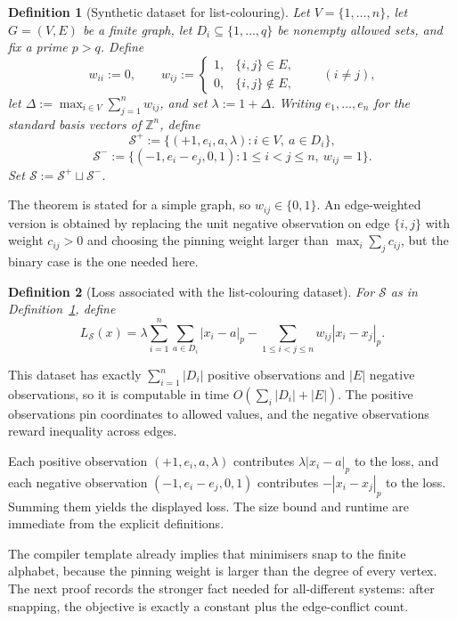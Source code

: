 \documentclass[11pt]{article}
\newtheorem{definition}{Definition}
\begin{document}
\begin{definition}[Synthetic dataset for list-colouring]
\label{def:list-dataset}
Let \(V=\{1,\dots,n\}\), let \(G=(V,E)\) be a finite graph, let \(D_i\subseteq \{1,\dots,q\}\) be nonempty allowed sets, and fix a prime \(p>q\). Define
\[
w_{ii}:=0,
\qquad
w_{ij}:=
\begin{cases}
1, & \{i,j\}\in E,\\
0, & \{i,j\}\notin E,
\end{cases}
\qquad (i\neq j),
\]
let \(\Delta:=\max_{i\in V}\sum_{j=1}^n w_{ij}\), and set \(\lambda:=1+\Delta\). Writing \(e_1,\dots,e_n\) for the standard basis vectors of \(\mathbb Z^n\), define
\[
\mathcal S^+ := \{(+1,e_i,a,\lambda): i\in V,\ a\in D_i\},
\]
\[
\mathcal S^- := \{(-1,e_i-e_j,0,1): 1\le i<j\le n,\ w_{ij}=1\}.
\]
Set \(\mathcal S:=\mathcal S^+\sqcup\mathcal S^-\).
\end{definition}

The theorem is stated for a simple graph, so \(w_{ij}\in\{0,1\}\). An edge-weighted version is obtained by replacing the unit negative observation on edge \(\{i,j\}\) with weight \(c_{ij}>0\) and choosing the pinning weight larger than \(\max_i\sum_j c_{ij}\), but the binary case is the one needed here.

\begin{definition}[Loss associated with the list-colouring dataset]
\label{def:list-loss}
For \(\mathcal S\) as in Definition~\ref{def:list-dataset}, define
\[
L_{\mathcal S}(x)
=
\lambda\sum_{i=1}^n \sum_{a\in D_i}|x_i-a|_p
-\sum_{1\le i<j\le n} w_{ij}|x_i-x_j|_p.
\]
\end{definition}

This dataset has exactly \(\sum_{i=1}^n |D_i|\) positive observations and \(|E|\) negative observations, so it is computable in time \(O(\sum_i |D_i|+|E|)\). The positive observations pin coordinates to allowed values, and the negative observations reward inequality across edges.

Each positive observation \((+1,e_i,a,\lambda)\) contributes \(\lambda|x_i-a|_p\) to the loss, and each negative observation \((-1,e_i-e_j,0,1)\) contributes \(-|x_i-x_j|_p\) to the loss. Summing them yields the displayed loss. The size bound and runtime are immediate from the explicit definitions.

The compiler template already implies that minimisers snap to the finite alphabet, because the pinning weight is larger than the degree of every vertex. The next proof records the stronger fact needed for all-different systems: after snapping, the objective is exactly a constant plus the edge-conflict count.
\end{document}
